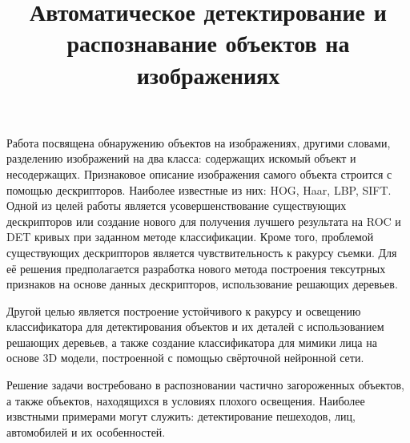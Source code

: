 \documentclass[a4paper,12pt]{article}
\title{Автоматическое детектирование и распознавание объектов на изображениях}
\begin{document}
\maketitle
\newpage

	Работа посвящена обнаружению объектов на изображениях, другими словами, разделению изображений на два класса: содержащих искомый объект и несодержащих. Признаковое описание изображения самого объекта строится с помощью дескрипторов. Наиболее известные из них: HOG, Haar, LBP, SIFT. Одной из целей работы является усовершенствование существующих дескрипторов или создание нового для получения лучшего результата на ROC и DET кривых при заданном методе классификации. Кроме того, проблемой существующих дескрипторов является чувствительность к ракурсу съемки. Для её решения предполагается разработка нового метода построения тексутрных признаков на основе данных дескрипторов, использование решающих деревьев.

	Другой целью является построение устойчивого к ракурсу и освещению классификатора для детектирования объектов и их деталей с использованием решающих деревьев, а также создание классификатора для мимики лица на основе 3D модели, построенной с помощью свёрточной нейронной сети.
	
	Решение задачи востребовано в распозновании частично загороженных объектов, а также объектов, находящихся в условиях плохого освещения. Наиболее извстными примерами могут служить: детектирование пешеходов, лиц, автомобилей и их особенностей.         
\end{document}
